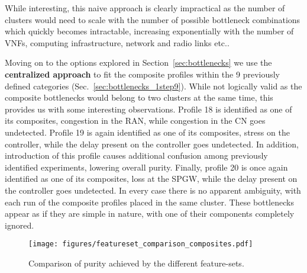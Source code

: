 \documentclass[journal,comsoc]{IEEEtran}
\begin{document}
While interesting, this naive approach is clearly impractical as the number of clusters would need to scale with the number of possible bottleneck combinations which quickly becomes intractable, increasing exponentially with the number of VNFs, computing infrastructure, network and radio links etc..

% 
Moving on to the options explored in Section~\ref{sec:bottlenecks} we use the \textbf{centralized approach} to fit the composite profiles within the 9 previously defined categories (Sec.~\ref{sec:bottlenecks_1step9}).
While not logically valid as the composite bottlenecks would belong to two clusters at the same time, this provides us with some interesting  observations.
Profile 18 is identified as one of its composites, congestion in the RAN, while congestion in the CN goes undetected.
Profile 19 is again identified as one of its composites, stress on the controller, while the delay present on the controller goes undetected. In addition, introduction of this profile causes additional confusion among previously identified experiments, lowering overall purity.
Finally, profile 20 is once again identified as one of its composites, loss at the SPGW, while the delay present on the controller goes undetected.
In every case there is no apparent ambiguity, with each run of the composite profiles placed in the same cluster. 
These bottlenecks appear as if they are simple in nature, with one of their components completely ignored.

\begin{figure}[t] 
	\centering
	\texttt{[image: figures/featureset\_comparison\_composites.pdf]}
	\vspace{-8mm}
	\caption{Comparison of purity achieved by the different feature-sets.}
	\vspace{-4mm}
	\label{fig:features_composite}
\end{figure}
\end{document}
